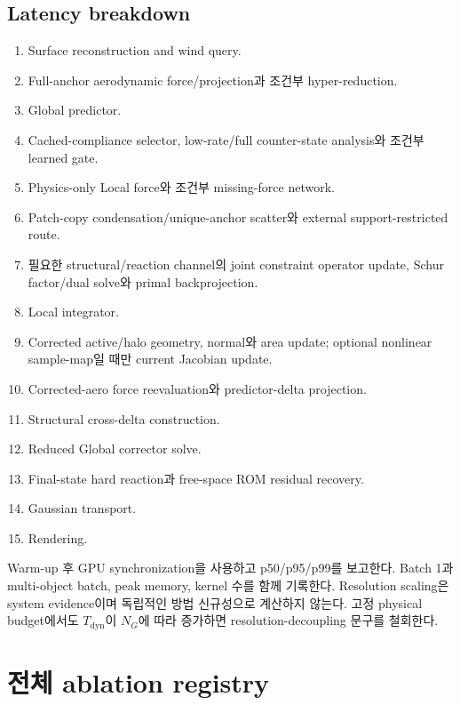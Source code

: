 \documentclass[11pt,a4paper]{article}
\begin{document}
\subsection*{Latency breakdown}

\begin{enumerate}[leftmargin=1.7em]
  \item Surface reconstruction and wind query.
  \item Full-anchor aerodynamic force/projection과 조건부 hyper-reduction.
  \item Global predictor.
  \item Cached-compliance selector, low-rate/full counter-state analysis와 조건부 learned gate.
  \item Physics-only Local force와 조건부 missing-force network.
  \item Patch-copy condensation/unique-anchor scatter와 external support-restricted route.
  \item 필요한 structural/reaction channel의 joint constraint operator update,
  Schur factor/dual solve와 primal backprojection.
  \item Local integrator.
  \item Corrected active/halo geometry, normal와 area update;
  optional nonlinear sample-map일 때만 current Jacobian update.
  \item Corrected-aero force reevaluation와 predictor-delta projection.
  \item Structural cross-delta construction.
  \item Reduced Global corrector solve.
  \item Final-state hard reaction과 free-space ROM residual recovery.
  \item Gaussian transport.
  \item Rendering.
\end{enumerate}

Warm-up 후 GPU synchronization을 사용하고 p50/p95/p99를 보고한다.
Batch 1과 multi-object batch, peak memory, kernel 수를 함께 기록한다.
Resolution scaling은 system evidence이며 독립적인 방법 신규성으로 계산하지 않는다.
고정 physical budget에서도 \(T_{\mathrm{dyn}}\)이 \(N_G\)에 따라 증가하면
resolution-decoupling 문구를 철회한다.

\section{전체 ablation registry}
\end{document}
